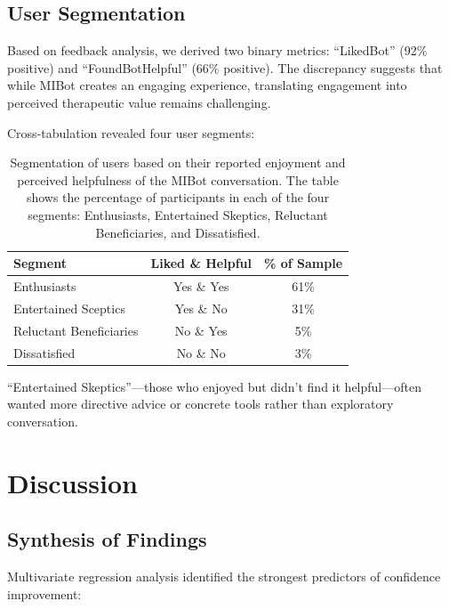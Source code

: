 \subsection{User Segmentation}

Based on feedback analysis, we derived two binary metrics: ``LikedBot'' (92\% positive) and ``FoundBotHelpful'' (66\% positive). The discrepancy suggests that while MIBot creates an engaging experience, translating engagement into perceived therapeutic value remains challenging.

Cross-tabulation revealed four user segments:

\begin{table}[ht]
  \centering
  \small
  \setlength{\tabcolsep}{4pt}
  \renewcommand{\arraystretch}{1.1}
  \begin{tabular}{@{}lcc@{}}
    \toprule
    \textbf{Segment} & \textbf{Liked \& Helpful} & \textbf{\% of Sample} \\
    \midrule
    Enthusiasts & Yes \& Yes & 61\% \\
    Entertained Sceptics & Yes \& No & 31\% \\
    Reluctant Beneficiaries & No \& Yes & 5\% \\
    Dissatisfied & No \& No & 3\% \\
    \bottomrule
  \end{tabular}
  \caption[User Experience Segments]{Segmentation of users based on their reported enjoyment and perceived helpfulness of the MIBot conversation. The table shows the percentage of participants in each of the four segments: Enthusiasts, Entertained Skeptics, Reluctant Beneficiaries, and Dissatisfied.}
  \label{table:user_segments}
\end{table}

``Entertained Skeptics''---those who enjoyed but didn't find it helpful---often wanted more directive advice or concrete tools rather than exploratory conversation.

\section{Discussion}
\label{sec:discussion}

\subsection{Synthesis of Findings}
\label{sec:synthesis}

Multivariate regression analysis identified the strongest predictors of confidence improvement:

